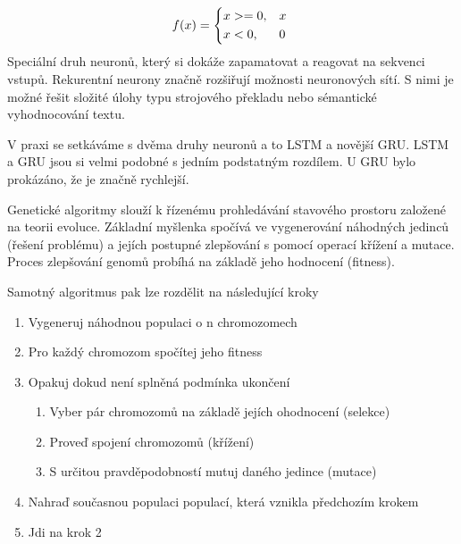 \[ 
f(x) = 
\begin{dcases*} 
\text{$x>=0$,} & $x$ \\ 
\text{$x<0$,} & 0 
\end{dcases*} 
\]
Speciální druh neuronů, který si dokáže zapamatovat a reagovat na sekvenci vstupů. Rekurentní neurony značně rozšiřují možnosti neuronových sítí. S nimi je možné řešit složité úlohy typu strojového překladu nebo sémantické vyhodnocování textu.

V praxi se setkáváme s dvěma druhy neuronů a to LSTM a novější GRU. LSTM a GRU jsou si velmi podobné s jedním podstatným rozdílem. U GRU bylo prokázáno, že je značně rychlejší. 


Genetické algoritmy slouží k řízenému prohledávání stavového prostoru založené na teorii evoluce. \cite[s.~17]{kozaGP}
Základní myšlenka spočívá ve vygenerování náhodných jedinců (řešení problému) a jejích postupné zlepšování s pomocí operací křížení a mutace. Proces zlepšování genomů probíhá na základě jeho hodnocení (fitness).

Samotný algoritmus pak lze rozdělit na následující kroky \cite[s.~12]{geneticAlgorithms}

\begin{enumerate}
	\item Vygeneruj náhodnou populaci o n chromozomech
	\item Pro každý chromozom spočítej jeho fitness
	\item Opakuj dokud není splněná podmínka ukončení
	\begin{enumerate}
		\item Vyber pár chromozomů na základě jejích ohodnocení (selekce)
		\item Proveď spojení chromozomů (křížení)
		\item S určitou pravděpodobností mutuj daného jedince (mutace)
	\end{enumerate}
	\item Nahraď současnou populaci populací, která vznikla předchozím krokem
	\item Jdi na krok 2
\end{enumerate}


